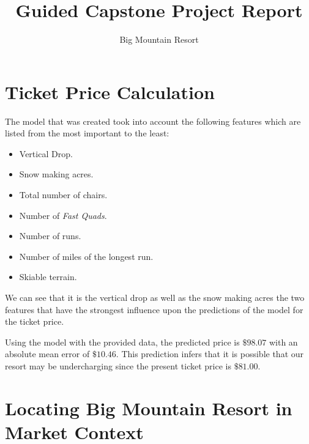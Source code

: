 \documentclass[twocolumn, 12pt]{article}
\title{Guided Capstone Project Report}
\author{Big Mountain Resort}
\begin{document}
\maketitle

\section{Ticket Price Calculation}

\noindent
The model that was created took into account the following features which are listed from the most important to the least:

\begin{itemize}
	\item Vertical Drop.
	\item Snow making acres.
	\item Total number of chairs.
	\item Number of \textit{Fast Quads}.
	\item Number of runs.
	\item Number of miles of the longest run.
	\item Skiable terrain.
\end{itemize}

We can see that it is the vertical drop as well as the snow making acres the two features that have the strongest influence upon the predictions of the model for the ticket price.\linebreak


Using the model with the provided data, the predicted price is $ \$98.07 $ with an absolute mean error of $ \$ 10.46 $. This prediction infers that it is possible that our resort may be undercharging since the present ticket price is $ \$81.00 $.
	
\section{Locating Big Mountain Resort in Market Context}
\end{document}
